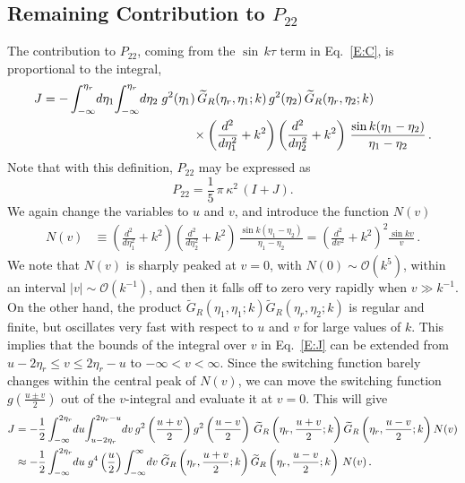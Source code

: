 \documentclass[preprint,prd,showpacs,superscriptaddress]{revtex4}
\begin{document}
\subsection{Remaining Contribution to $P_{22}$}

The contribution to $P_{22}$, coming from the  $\sin\, k\tau$ term in Eq.~\eqref{E:C}, 
is proportional to the integral,
\begin{align}\label{E:J}
	J&=-\int_{-\infty}^{\eta_{r}}\!d\eta_{1}\!\int_{-\infty}^{\eta_{r}}\!d\eta_{2}\;g^{2}(\eta_{1})\,
	\widetilde{G}_{R}(\eta_{r},\eta_{1};{k})\,g^{2}(\eta_{2})\,\widetilde{G}_{R}(\eta_{r},\eta_{2};{k})\notag\\
	&\qquad\qquad\qquad\qquad\qquad\qquad\times\left(\frac{d^{2}}{d\eta_{1}^{2}}+k^{2}\right)\left(\frac{d^{2}}{d\eta_{2}^{2}}
	+k^{2}\right)\,\frac{\sin k(\eta_{1}-\eta_{2})}{\eta_{1}-\eta_{2}}\,.
\end{align} 
Note that with this definition, $P_{22}$ may be expressed as
\begin{equation}
P_{22} = \frac{1}{5} \, \pi \, \kappa^2\, (I + J).
\label{E:IJ}
\end{equation}
We again change the variables to $u$ and $v$, and introduce the function $N(v)$
\begin{align}
	N(v)&\equiv\left(\frac{d^{2}}{d\eta_{1}^{2}}+k^{2}\right)\left(\frac{d^{2}}{d\eta_{2}^{2}}+k^{2}\right)\,
	\frac{\sin k(\eta_{1}-\eta_{2})}{\eta_{1}-\eta_{2}}=\left(\frac{d^{2}}{dv^{2}}+k^{2}\right)^{2}\frac{\sin kv}{v}\,.
\end{align}    
We note that $N(v)$ is sharply peaked at $v=0$, with $N(0)\sim\mathcal{O}(k^{5})$, within an interval 
$\lvert v\rvert\sim\mathcal{O}(k^{-1})$, and then it falls off to zero very rapidly when $v\gg k^{-1}$. On the other hand, 
the product $\widetilde{G}_{R}(\eta_{1},\eta_{1};{k})\widetilde{G}_{R}(\eta_{r},\eta_{2};{k})$ is regular and 
finite, but oscillates very fast with respect to $u$ and $v$ for large values of $k$. This implies that the bounds 
of the integral over $v$ in Eq.~\eqref{E:J} can be extended from $u-2\eta_r \leq v \leq 2\eta_r -u$ to $-\infty < v < \infty$. 
Since the switching function barely changes within the central peak of $N(v)$, we can move the switching function 
$g(\frac{u\pm v}{2})$ out of the $v$-integral and evaluate it at $v=0$. This will give
\begin{align}
	J& =-\frac{1}{2}\int_{-\infty}^{2\eta_{r}}\!du\!\int_{u-2\eta_{r}}^{2\eta_{r}-u}\!dv\, g^{2}\left(\frac{u+v}{2}\right)g^{2}\left(\frac{u-v}{2}\right)\,
	\widetilde{G}_{R}\left(\eta_{r},\frac{u+v}{2};{k}\right)\widetilde{G}_{R}\left(\eta_{r},\frac{u-v}{2};{k}\right) N(v)\notag\\
	&\approx-\frac{1}{2}\int_{-\infty}^{2\eta_{r}}\!du\;g^{4}\left(\frac{u}{2}\right)\int_{-\infty}^{\infty}\!dv\;
	\widetilde{G}_{R}\left(\eta_{r},\frac{u+v}{2};{k}\right)\widetilde{G}_{R}\left(\eta_{r},\frac{u-v}{2};{k}\right)\,N(v)\,.
\end{align}    
\end{document}
